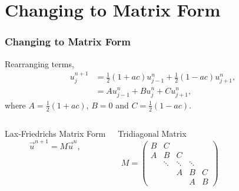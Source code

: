 \documentclass[compress]{beamer}
\begin{document}
\section{Changing to Matrix Form}
\begin{frame} \frametitle{Changing to Matrix Form}
Rearranging terms,
\begin{align*}
u_j^{n+1} &= \frac{1}{2}\left(1+ac\right)u_{j-1}^n+\frac{1}{2}\left(1-ac\right)u_{j+1}^n,\nonumber\\
&= Au_{j-1}^n + Bu_j^n + Cu_{j+1}^n,
\end{align*}
where $A = \frac{1}{2}\left(1+ac\right)$, $B = 0$ and $C = \frac{1}{2}\left(1-ac\right)$. 
\begin{columns}
\begin{block}{Lax-Friedrichs Matrix Form}
$$\vec{u}^{n+1} = M\vec{u}^n,$$
\end{block}
\begin{block}{Tridiagonal Matrix}
\begin{align*}
M =
  \begin{pmatrix}
    B & C & \\
    A & B & C\\
      & \ddots & \ddots & \ddots\\
      &  & A & B & C\\    
      &  &  & A & B
  \end{pmatrix}
\end{align*}
\end{block}
\end{columns}
\end{frame}
\end{document}
